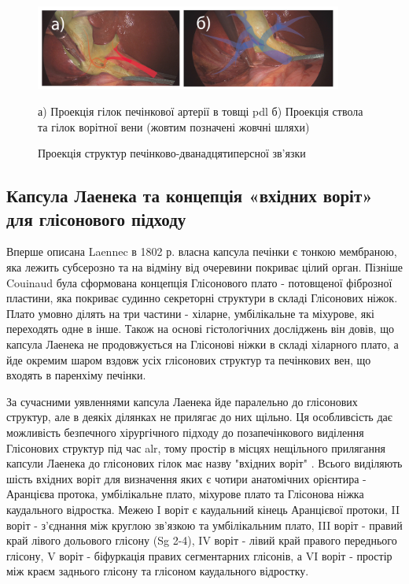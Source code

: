\begin{refsection}
\begin{figure}[h]
\caption{Проекція структур печінково-дванадцятиперсної зв'язки}

\includegraphics[width=0.9\textwidth]{Illustrations/Chapter_01/External landmarks_PDL.png}
\label{fig:External_landmarks_PDL}

\small
а) Проекція гілок печінкової артерії в товщі \acrshort{pdl} б) Проекція ствола та гілок ворітної вени (жовтим позначені жовчні шляхи)
\end{figure}


\subsection{Капсула Лаенека та концепція «вхідних воріт» для глісонового підходу}

Вперше описана Laennec в 1802 р. власна капсула печінки є тонкою мембраною, яка лежить субсерозно та на відміну від очеревини покриває цілий орган. Пізніше Couinaud була сформована концепція Глісонового плато - потовщеної фіброзної пластини, яка покриває судинно секреторні структури в складі Глісонових ніжок. Плато умовно ділять на три частини - хіларне, умбілікальне та міхурове, які переходять одне в інше. Також на основі гістологічних досліджень він довів, що капсула Лаенека не продовжується на Глісонові ніжки в складі хіларного плато, а йде окремим шаром вздовж усіх глісонових структур та печінкових вен, що входять в паренхіму печінки.

За сучасними уявленнями капсула Лаенека йде паралельно до глісонових структур, але в деякіх ділянках не прилягає до них щільно. Ця особливсість дає можливість безпечного хірургічного підходу до позапечінкового виділення Глісонових структур під час \acrshort{alr}, тому простір в місцях нещільного прилягання капсули Лаенека до глісонових гілок має назву "вхідних воріт" \cite{Sugioka2017}. Всього виділяють шість вхідних воріт для визначення яких є чотири анатомічних орієнтира - Аранцієва протока, умбілікальне плато, міхурове плато та Глісонова ніжка каудального відростка. Межею I воріт є каудальний кінець Аранцієвої протоки, II воріт - з'єднання між круглою зв'язкою та умбілікальним плато, III воріт - правий край лівого дольового глісону (Sg 2-4), IV воріт - лівий край правого переднього глісону, V воріт - біфуркація правих сегментарних глісонів, а VI воріт - простір між краєм заднього глісону та глісоном каудального відростку. 


\end{refsection}
